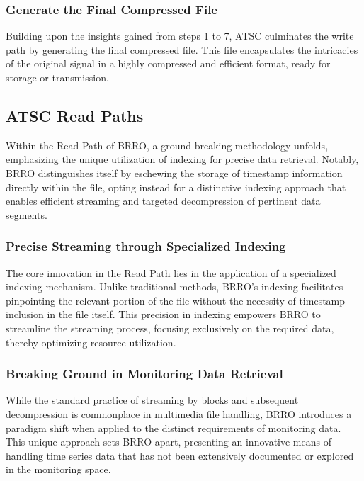 \documentclass[conference]{IEEEtran}
\begin{document}
\vspace{10pt}
\subsubsection{Generate the Final Compressed File}
Building upon the insights gained from steps 1 to 7, ATSC culminates the write path by generating the final compressed file. This file encapsulates the intricacies of the original signal in a highly compressed and efficient format, ready for storage or transmission.





\subsection{ATSC Read Paths}

Within the Read Path of BRRO, a ground-breaking methodology unfolds, emphasizing the unique utilization of indexing for precise data retrieval. Notably, BRRO distinguishes itself by eschewing the storage of timestamp information directly within the file, opting instead for a distinctive indexing approach that enables efficient streaming and targeted decompression of pertinent data segments.

\vspace{10pt}
\subsubsection{Precise Streaming through Specialized Indexing}\label{SCM}
The core innovation in the Read Path lies in the application of a specialized indexing mechanism. Unlike traditional methods, BRRO's indexing facilitates pinpointing the relevant portion of the file without the necessity of timestamp inclusion in the file itself. This precision in indexing empowers BRRO to streamline the streaming process, focusing exclusively on the required data, thereby optimizing resource utilization. 

\vspace{10pt}
\subsubsection{Breaking Ground in Monitoring Data Retrieval}\label{SCM}
While the standard practice of streaming by blocks and subsequent decompression is commonplace in multimedia file handling, BRRO introduces a paradigm shift when applied to the distinct requirements of monitoring data. This unique approach sets BRRO apart, presenting an innovative means of handling time series data that has not been extensively documented or explored in the monitoring space. 
\end{document}
